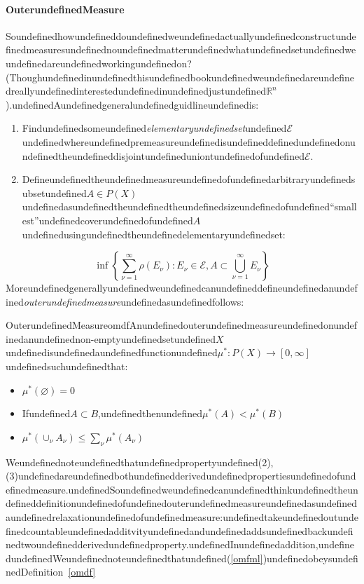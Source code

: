 \paragraph{OuterundefinedMeasure}

Soundefinedhowundefineddoundefinedweundefinedactuallyundefinedconstructundefinedmeasuresundefinednoundefinedmatterundefinedwhatundefinedsetundefinedweundefinedareundefinedworkingundefinedon?(Thoughundefinedinundefinedthisundefinedbookundefinedweundefinedareundefinedreallyundefinedinterestedundefinedinundefinedjustundefined$\mathbb{R}^n$).undefinedAundefinedgeneralundefinedguidlineundefinedis:

\begin{enumerate}
\item Findundefinedsomeundefined\textit{elementaryundefinedset}undefined$\mathcal{E}$undefinedwhereundefinedpremeasureundefinedisundefineddefinedundefinedonundefinedtheundefineddisjointundefineduniontundefinedofundefined$\mathcal{E}$.
\item Defineundefinedtheundefinedmeasureundefinedofundefinedarbitraryundefinedsubsetundefined$A\in P(X)$undefinedasundefinedtheundefinedtheundefinedsizeundefinedofundefined``smallest''undefinedcoverundefinedofundefined$A$undefinedusingundefinedtheundefinedelementaryundefinedset:
\end{enumerate}
\begin{equation}
\label{omfml}
\inf \left\{\sum_{\nu=1}^{\infty} \rho(E_{\nu}): E_{\nu}\in \mathcal{E}, A\subset \bigcup_{\nu=1}^{\infty} E_{\nu}\right\}
\end{equation}
Moreundefinedgenerallyundefinedweundefinedcanundefineddefineundefinedanundefined\textit{outerundefinedmeasure}undefinedasundefinedfollows:

\begin{mystthmdefinition}{OuterundefinedMeasure}{omdf}\label{omdf}Anundefinedouterundefinedmeasureundefinedonundefinedanundefinednon-emptyundefinedsetundefined$X$undefinedisundefinedaundefinedfunctionundefined$\mu^* : P(X)\to [0,\infty]$undefinedsuchundefinedthat:

\begin{itemize}
\item $\mu^*(\varnothing)=0$
\item Ifundefined$A\subset B$,undefinedthenundefined$\mu^*(A)<\mu^*(B)$
\item $\mu^*(\cup_{\nu}A_{\nu})\leq \sum_{\nu} \mu^* (A_{\nu })$
\end{itemize}

\end{mystthmdefinition}
Weundefinednoteundefinedthatundefinedpropertyundefined(2),(3)undefinedareundefinedbothundefinedderivedundefinedpropertiesundefinedofundefinedmeasure.undefinedSoundefinedweundefinedcanundefinedthinkundefinedtheundefineddefinitionundefinedofundefinedouterundefinedmeasureundefinedasundefinedaundefinedrelaxationundefinedofundefinedmeasure:undefinedtakeundefinedoutundefinedcountableundefinedadditvityundefinedandundefinedaddsundefinedbackundefinedtwoundefinedderivedundefinedproperty.undefinedInundefinedaddition,undefinedundefinedWeundefinednoteundefinedthatundefined(\ref{omfml})undefinedobeysundefinedDefinition~\ref{omdf}


